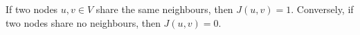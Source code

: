 If two nodes $u, v \in V$ share the same neighbours, then $J(u,v) = 1$. Conversely, if two nodes share no neighbours, then $J(u, v) = 0$. 







